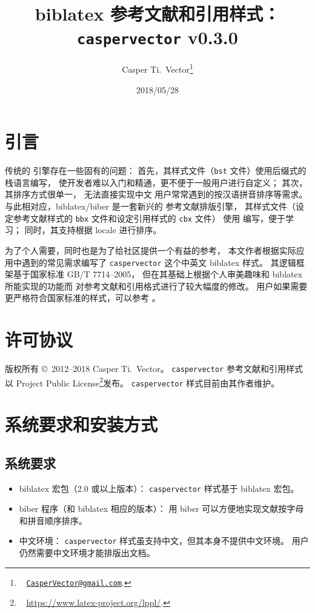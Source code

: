 \documentclass[UTF8]{ctexart}
\begin{document}
\title{\textbf{biblatex 参考文献和引用样式：\texttt{caspervector} v0.3.0}}
\author{%
	Casper Ti.\ Vector\thanks{\ %
		\href{mailto:CasperVector@gmail.com}{\texttt{CasperVector@gmail.com}}.%
	}%
}
\date{2018/05/28}
\maketitle

\section{引言}

传统的  引擎存在一些固有的问题：
首先，其样式文件（\verb|bst| 文件）使用后缀式的栈语言编写，
使开发者难以入门和精通，更不便于一般用户进行自定义；
其次，其排序方式很单一，
无法直接实现中文  用户常常遇到的按汉语拼音排序等需求。
与此相对应，biblatex\supercite{biblatex}/biber\supercite{biber}
是一套新兴的  参考文献排版引擎，
其样式文件（设定参考文献样式的 \verb|bbx| 文件和设定引用样式的 \verb|cbx| 文件）
使用  编写，便于学习；
同时，其支持根据 locale 进行排序。

为了个人需要，同时也是为了给社区提供一个有益的参考，
本文作者根据实际应用中遇到的常见需求编写了
\verb|caspervector| 这个中英文 biblatex 样式。
其逻辑框架基于国家标准 GB/T 7714--2005\supercite{gbt7714-2005}，
但在其基础上根据个人审美趣味和 biblatex 所能实现的功能而
对参考文献和引用格式进行了较大幅度的修改。
用户如果需要更严格符合国家标准的样式，可以参考 \parencite{blx-gb7714-2015}。

\section{许可协议}

版权所有 \copyright\ 2012--2018 Casper Ti.\ Vector。%
\verb|caspervector| 参考文献和引用样式以
 Project Public License\footnote{\ %
	\url{https://www.latex-project.org/lppl/}.%
}发布。%
\verb|caspervector| 样式目前由其作者维护。

\section{系统要求和安装方式}
\subsection{系统要求}

\begin{itemize}
	\item biblatex 宏包（2.0 或以上版本）：%
		\verb|caspervector| 样式基于 biblatex 宏包。
	\item biber 程序（和 biblatex 相应的版本）：
		用 biber 可以方便地实现文献按字母和拼音顺序排序。
	\item 中文环境：%
		\verb|caspervector| 样式虽支持中文，但其本身不提供中文环境。
		用户仍然需要中文环境才能排版出文档。
\end{itemize}
\end{document}
